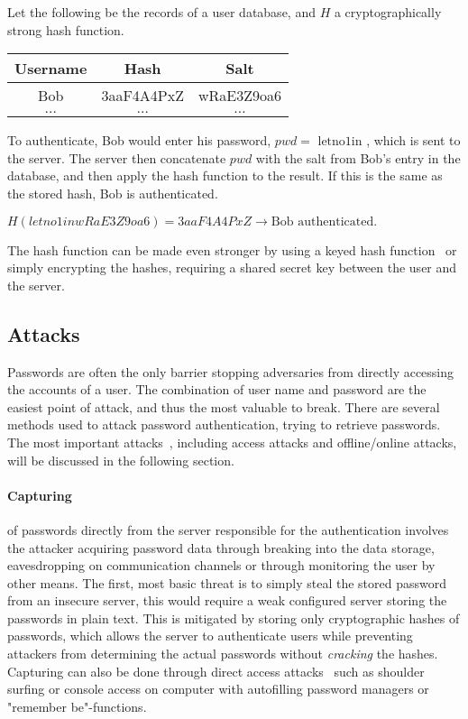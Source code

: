 \begin{example}
Let the following be the records of a user database, and $H$ a cryptographically strong hash function.
    \begin{table}[ht!]
        \centering
    \begin{tabular}{|c|c|c|}
        \hline
        Username & Hash & Salt \\
        \hline
        Bob & 3aaF4A4PxZ & wRaE3Z9oa6 \\
        \hline
        $\dots$ & $\dots$ & $\dots$ \\
        \hline
    \end{tabular}
    \end{table}
\par To authenticate, Bob would enter his password, $pwd=\text{ letno1in }$, which is sent to the server. The server then concatenate $pwd$ with the salt from Bob's entry in the database, and then apply the hash function to the result. If this is the same as the stored hash, Bob is authenticated.\\
 \centerline{   $H(letno1inwRaE3Z9oa6) = 3aaF4A4PxZ \rightarrow \text{Bob authenticated}.$  }

\end{example}



The hash function can be made even stronger by using a keyed hash function~\cite{keyedhash} or simply encrypting the hashes, requiring a shared secret key between the user and the server. 



\subsection{Attacks}\label{atck}
Passwords are often the only barrier stopping adversaries from directly accessing the accounts of a user. The combination of user name and password are the easiest point of attack, and thus the most valuable to break. There are several methods used to attack password authentication, trying to retrieve passwords. The most important attacks~\cite{nist-guide, strong-pws_florencio}, including access attacks and offline/online attacks, will be discussed in the following section. 
\paragraph{Capturing} of passwords directly from the server responsible for the authentication involves the attacker acquiring password data through breaking into the data storage, eavesdropping on communication channels or through monitoring the user by other means. The first, most basic threat is to simply steal the stored password from an insecure server, this would require a weak configured server storing the passwords in plain text. This is mitigated by storing only cryptographic hashes of passwords, which allows the server to authenticate users while preventing attackers from determining the actual passwords without \emph{cracking} the hashes. Capturing can also be done through direct access attacks~\cite{guide-pws} such as shoulder surfing or console access on computer with autofilling password managers or "remember be"-functions.

